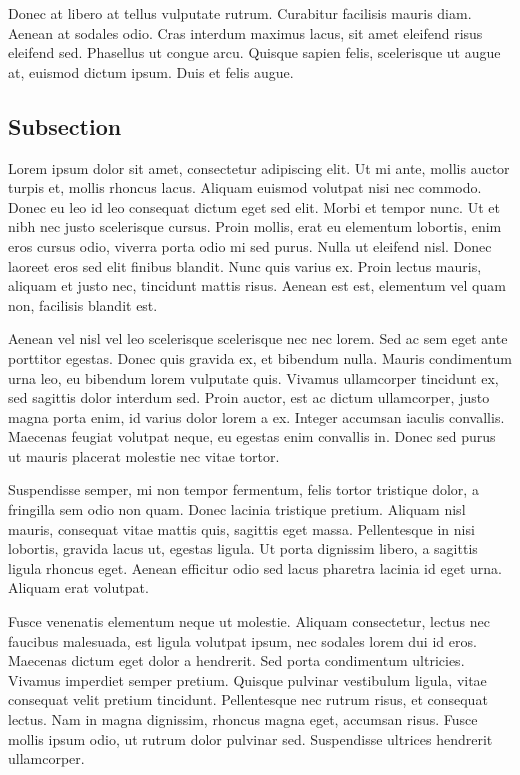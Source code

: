 Donec at libero at tellus vulputate rutrum. Curabitur facilisis mauris diam. Aenean at sodales odio. Cras interdum maximus lacus, sit amet eleifend risus eleifend sed. Phasellus ut congue arcu. Quisque sapien felis, scelerisque ut augue at, euismod dictum ipsum. Duis et felis augue.
\subsection{Subsection}
Lorem ipsum dolor sit amet, consectetur adipiscing elit. Ut mi ante, mollis auctor turpis et, mollis rhoncus lacus. Aliquam euismod volutpat nisi nec commodo. Donec eu leo id leo consequat dictum eget sed elit. Morbi et tempor nunc. Ut et nibh nec justo scelerisque cursus. Proin mollis, erat eu elementum lobortis, enim eros cursus odio, viverra porta odio mi sed purus. Nulla ut eleifend nisl. Donec laoreet eros sed elit finibus blandit. Nunc quis varius ex. Proin lectus mauris, aliquam et justo nec, tincidunt mattis risus. Aenean est est, elementum vel quam non, facilisis blandit est.

Aenean vel nisl vel leo scelerisque scelerisque nec nec lorem. Sed ac sem eget ante porttitor egestas. Donec quis gravida ex, et bibendum nulla. Mauris condimentum urna leo, eu bibendum lorem vulputate quis. Vivamus ullamcorper tincidunt ex, sed sagittis dolor interdum sed. Proin auctor, est ac dictum ullamcorper, justo magna porta enim, id varius dolor lorem a ex. Integer accumsan iaculis convallis. Maecenas feugiat volutpat neque, eu egestas enim convallis in. Donec sed purus ut mauris placerat molestie nec vitae tortor.

Suspendisse semper, mi non tempor fermentum, felis tortor tristique dolor, a fringilla sem odio non quam. Donec lacinia tristique pretium. Aliquam nisl mauris, consequat vitae mattis quis, sagittis eget massa. Pellentesque in nisi lobortis, gravida lacus ut, egestas ligula. Ut porta dignissim libero, a sagittis ligula rhoncus eget. Aenean efficitur odio sed lacus pharetra lacinia id eget urna. Aliquam erat volutpat.

Fusce venenatis elementum neque ut molestie. Aliquam consectetur, lectus nec faucibus malesuada, est ligula volutpat ipsum, nec sodales lorem dui id eros. Maecenas dictum eget dolor a hendrerit. Sed porta condimentum ultricies. Vivamus imperdiet semper pretium. Quisque pulvinar vestibulum ligula, vitae consequat velit pretium tincidunt. Pellentesque nec rutrum risus, et consequat lectus. Nam in magna dignissim, rhoncus magna eget, accumsan risus. Fusce mollis ipsum odio, ut rutrum dolor pulvinar sed. Suspendisse ultrices hendrerit ullamcorper.

